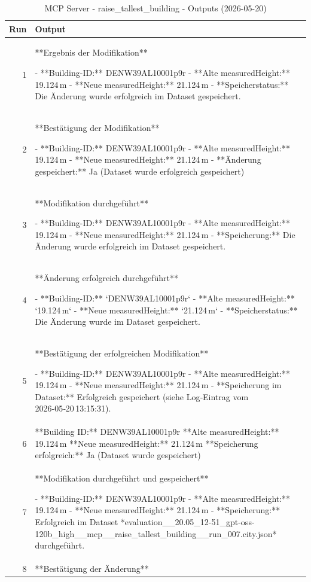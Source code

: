 \documentclass[a4paper,11pt]{article}
\begin{document}
\begin{table}[ht]
\centering
\scriptsize
\caption{MCP Server - raise\_tallest\_building - Outputs (2026-05-20)}
\label{tab:mcp\_raise\_tallest\_building\_outputs\_2026-05-20}
\begin{tabular}{r p{12cm}}
\hline
Run & Output \\
\hline
1 & **Ergebnis der Modifikation**

- **Building-ID:** DENW39AL10001p9r  
- **Alte measuredHeight:** 19.124 m  
- **Neue measuredHeight:** 21.124 m  
- **Speicherstatus:** Die Änderung wurde erfolgreich im Dataset gespeichert. \\
2 & **Bestätigung der Modifikation**

- **Building-ID:** DENW39AL10001p9r  
- **Alte measuredHeight:** 19.124 m  
- **Neue measuredHeight:** 21.124 m  
- **Änderung gespeichert:** Ja (Dataset wurde erfolgreich gespeichert) \\
3 & **Modifikation durchgeführt**

- **Building-ID:** DENW39AL10001p9r  
- **Alte measuredHeight:** 19.124 m  
- **Neue measuredHeight:** 21.124 m  
- **Speicherung:** Die Änderung wurde erfolgreich im Dataset gespeichert. \\
4 & **Änderung erfolgreich durchgeführt**

- **Building-ID:** `DENW39AL10001p9r`  
- **Alte measuredHeight:** `19.124 m`  
- **Neue measuredHeight:** `21.124 m`  
- **Speicherstatus:** Die Änderung wurde im Dataset gespeichert. \\
5 & **Bestätigung der erfolgreichen Modifikation**

- **Building-ID:** DENW39AL10001p9r  
- **Alte measuredHeight:** 19.124 m  
- **Neue measuredHeight:** 21.124 m  
- **Speicherung im Dataset:** Erfolgreich gespeichert (siehe Log‑Eintrag vom 2026‑05‑20 13:15:31). \\
6 & **Building ID:** DENW39AL10001p9r  
**Alte measuredHeight:** 19.124 m  
**Neue measuredHeight:** 21.124 m  
**Speicherung erfolgreich:** Ja (Dataset wurde gespeichert) \\
7 & **Modifikation durchgeführt und gespeichert**

- **Building-ID:** DENW39AL10001p9r  
- **Alte measuredHeight:** 19.124 m  
- **Neue measuredHeight:** 21.124 m  
- **Speicherung:** Erfolgreich im Dataset *evaluation\_\_20.05\_12-51\_gpt-oss-120b\_high\_\_mcp\_\_raise\_tallest\_building\_\_run\_007.city.json* durchgeführt. \\
8 & **Bestätigung der Änderung**


\end{tabular}
\end{table}
\end{document}
